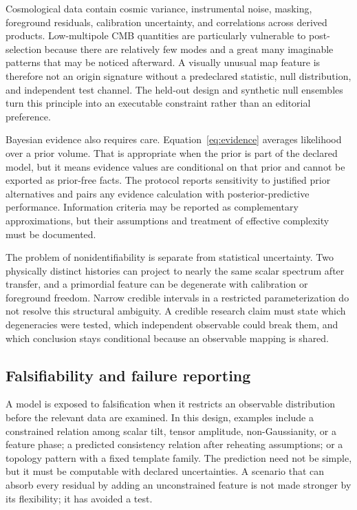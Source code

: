 \documentclass[10pt,conference]{IEEEtran}
\begin{document}
Cosmological data contain cosmic variance, instrumental noise, masking, foreground residuals, calibration uncertainty, and correlations across derived products. Low-multipole CMB quantities are particularly vulnerable to post-selection because there are relatively few modes and a great many imaginable patterns that may be noticed afterward. A visually unusual map feature is therefore not an origin signature without a predeclared statistic, null distribution, and independent test channel. The held-out design and synthetic null ensembles turn this principle into an executable constraint rather than an editorial preference.

Bayesian evidence also requires care. Equation~\eqref{eq:evidence} averages likelihood over a prior volume. That is appropriate when the prior is part of the declared model, but it means evidence values are conditional on that prior and cannot be exported as prior-free facts. The protocol reports sensitivity to justified prior alternatives and pairs any evidence calculation with posterior-predictive performance. Information criteria may be reported as complementary approximations, but their assumptions and treatment of effective complexity must be documented.

The problem of nonidentifiability is separate from statistical uncertainty. Two physically distinct histories can project to nearly the same scalar spectrum after transfer, and a primordial feature can be degenerate with calibration or foreground freedom. Narrow credible intervals in a restricted parameterization do not resolve this structural ambiguity. A credible research claim must state which degeneracies were tested, which independent observable could break them, and which conclusion stays conditional because an observable mapping is shared.

\subsection{Falsifiability and failure reporting}

A model is exposed to falsification when it restricts an observable distribution before the relevant data are examined. In this design, examples include a constrained relation among scalar tilt, tensor amplitude, non-Gaussianity, or a feature phase; a predicted consistency relation after reheating assumptions; or a topology pattern with a fixed template family. The prediction need not be simple, but it must be computable with declared uncertainties. A scenario that can absorb every residual by adding an unconstrained feature is not made stronger by its flexibility; it has avoided a test.
\end{document}

